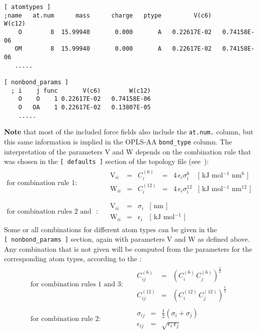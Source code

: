 {\small
\begin{verbatim}
[ atomtypes ]
;name   at.num      mass      charge   ptype         V(c6)        W(c12)
    O        8  15.99940       0.000       A   0.22617E-02   0.74158E-06
   OM        8  15.99940       0.000       A   0.22617E-02   0.74158E-06
   .....

[ nonbond_params ]
  ; i    j func       V(c6)        W(c12)
    O    O    1 0.22617E-02   0.74158E-06
    O   OA    1 0.22617E-02   0.13807E-05
    .....
\end{verbatim}}

{\bf Note} that most of the included force fields also include the {\tt at.num.} column, 
but this same information is implied in the OPLS-AA {\tt bond_type} column.
The interpretation of the parameters V and W depends on the combination rule 
that was chosen in the {\tt [~defaults~]} section of the topology file 
(see~):
\begin{eqnarray}
\mbox{for combination rule 1}: & &
\begin{array}{llllll}
  \mbox{V}_{ii} & = & C^{(6)}_{i}  & = & 4\,\epsilon_i\sigma_i^{6} &
  \mbox{[ kJ mol$^{-1}$ nm$^{6}$ ]}\\
  \mbox{W}_{ii} & = & C^{(12)}_{i} & = & 4\,\epsilon_i\sigma_i^{12} &
  \mbox{[ kJ mol$^{-1}$ nm$^{12}$ ]}\\
\end{array}
\\
\mbox{for combination rules 2 and 3}: & &
\begin{array}{llll}
  \mbox{V}_{ii} & = & \sigma_i   & \mbox{[ nm ]} \\
  \mbox{W}_{ii} & = & \epsilon_i & \mbox{[ kJ mol$^{-1}$ ]}
\end{array}
\end{eqnarray}
Some or all combinations for different atom types can be given in the 
{\tt [~nonbond_params~]} section, again with parameters V and W as defined 
above. Any combination that is not given will be computed from the parameters 
for the corresponding atom types, according to the :
\begin{eqnarray}
\mbox{for combination rules 1 and 3}: & &
\begin{array}{lll}
  C^{(6)}_{ij}  & = & \left(C^{(6)}_i\,C^{(6)}_j\right)^{\frac{1}{2}} \\
  C^{(12)}_{ij} & = & \left(C^{(12)}_i\,C^{(12)}_j\right)^{\frac{1}{2}}
\end{array}
\\
\mbox{for combination rule 2}: & &
\begin{array}{lll}
  \sigma_{ij}   & = & \frac{1}{2}(\sigma_i+\sigma_j) \\
  \epsilon_{ij} & = & \sqrt{\epsilon_i\,\epsilon_j}
\end{array}
\end{eqnarray}


